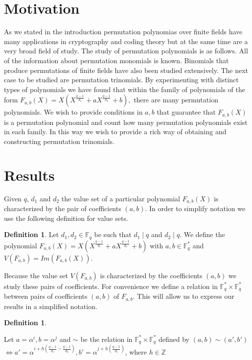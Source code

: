 \documentclass{article}
\theoremstyle{definition}
\newtheorem{definition}[theorem]{Definition}
\theoremstyle{remark}
\numberwithin{equation}{section}
\begin{document}
\section{Motivation}    

As we stated in the introduction permutation polynomias over finite fields have many applications in cryptography and coding theory but at the same time are a very broad field of study. The study of permutation polynomials is as follows. All of the information about permutation monomials is known. Binomials that produce permutations of finite fields have also been studied extensively. The next case to be studied are permutation trinomials. By experimenting with distinct types of polynomials we have found that within the family of polynomials of the form $F_{a,b}(X) =X\left(X^{\frac{q-1}{d_1}} + a X^{\frac{q-1}{d_2}} + b \right),$ there are many permutation polynomials. We wish to provide conditions in $a,b$ that guarantee that $F_{a,b}(X)$ is a permutation polynomial and count how many permutation polynomials exist in each family. In this way we wish to provide a rich way of obtaining and constructing permutation trinomials.

\section{Results}

Given $q$, $d_1$ and $d_2$ the value set of a particular polynomial $F_{a,b}(X)$ is characterized by the pair of coefficients $(a,b)$. In order to simplify notation we use the following definition for value sets.

\begin{definition}
  Let $d_1, d_2 \in \mathbb{F}_q$ be such that $d_1 \mid q$ and $d_2 \mid q$. We define the polynomial $F_{a,b}(X) = X(X^{\frac{q-1}{d_1}} + aX^{\frac{q-1}{d_2}} +b)$ with $a,b \in \mathbb{F}_q^{*}$ and $V(F_{a,b}) = Im(F_{a,b}(X))$.
\end{definition}

Because the value set $V(F_{a,b})$ is characterized by the coefficients $(a,b)$ we study these pairs of coefficients. For convenience we define a relation in $\mathbb{F}_q^* \times \mathbb{F}_q^*$ between pairs of coefficients $(a,b)$ of $F_{a,b}$. This will allow us to express our results in a simplified notation.

\begin{definition}\label{relacion}

  Let $a = \alpha^i, b = \alpha^j$ and $\sim$ be the relation in $\mathbb{F}_q^* \times \mathbb{F}_q^*$ defined by $(a,b) \sim (a', b')$ 
  $\Longleftrightarrow a' = \alpha^{i+h(\frac{q-1}{d_1} - \frac{q-1}{d_2})}, b' = \alpha^{j+h(\frac{q-1}{d_1})}$, where $h \in \mathbb{Z}$

\end{definition}
\end{document}
